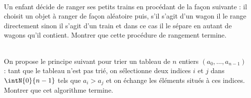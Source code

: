 \documentclass[11pt,a4paper]{article}
\begin{document}
\begin{Exercise}[title = {Rangements de petits trains}]\\
    Un enfant décide de ranger ses petits trains en procédant de la façon suivante : il choisit un objet à ranger de façon aléatoire puis, s'il s'agit d'un wagon il le range directement sinon il s'agit d'un train et dans ce cas il le sépare en autant de wagons qu'il contient. Montrer que cette procédure de rangement termine.
\end{Exercise}

\begin{Exercise}[title = {Tri par épuisement des inversions}]\\
    On propose le principe suivant pour trier un tableau de $n$ entiers $(a_0, \dots, a_{n-1})$ : tant que le tableau n'est pas trié, on sélectionne deux indices $i$ et $j$ dans $\intN{0}{n-1}$ tels que $a_i > a_j$ et on échange les éléments situés à ces indices.
    Montrer que cet algorithme termine.
\end{Exercise}
\end{document}
